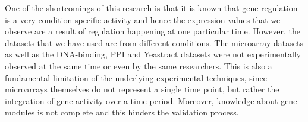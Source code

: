 One of the shortcomings of this research is that it is known that gene regulation is a very condition specific activity and hence the expression values that 
we observe are a result of regulation happening at one particular time. However, the datasets that we have used are from different conditions. 
The microarray datasets as well as the DNA-binding, PPI and Yeastract datasets were not experimentally observed at the same time or even by the same researchers. 
This is also a fundamental limitation of the underlying experimental techniques, since microarrays themselves do not represent a single time point, 
but rather the integration of gene activity over a time period. Moreover, knowledge about gene modules is not complete and this hinders the validation process. 

